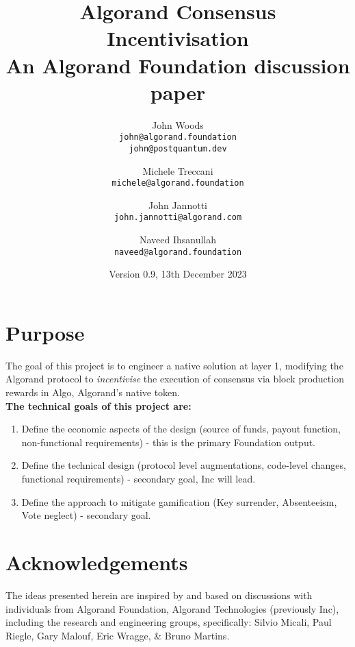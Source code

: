 \documentclass[11pt,a4paper]{article}
\begin{document}
\title {Algorand Consensus Incentivisation \\
       {\large \sc An Algorand Foundation discussion paper}}
\date  {Version 0.9, 13th December 2023}
\author{
    John Woods \\ 
    {\small \texttt{john@algorand.foundation}} \\
    {\small \texttt{john@postquantum.dev}} \\
\and 
    Michele Treccani \\
    {\small \texttt{michele@algorand.foundation}}
\and 
    John Jannotti \\
    {\small \texttt{john.jannotti@algorand.com}}
\and 
    Naveed Ihsanullah \\
    {\small \texttt{naveed@algorand.foundation}}
}

\maketitle

\section{Purpose}
The goal of this project is to engineer a native solution at layer 1, modifying the Algorand protocol to 
\emph{incentivise} the execution of consensus via block production rewards in Algo, Algorand's native token. \\

\textbf{The technical goals of this project are:}

\begin{enumerate}
    \item Define the economic aspects of the design (source of funds, payout function, non-functional requirements) - 
        this is the primary Foundation output.
    \item Define the technical design (protocol level augmentations, code-level changes, functional requirements) 
        - secondary goal, Inc will lead.
    \item Define the approach to mitigate gamification (Key surrender, Absenteeism, Vote neglect) - secondary goal.
\end{enumerate}

\pagebreak

\tableofcontents

\pagebreak

\section{Acknowledgements}
The ideas presented herein are inspired by and based on discussions with individuals from Algorand Foundation, 
Algorand Technologies (previously Inc), including the research and engineering groups, specifically: Silvio Micali, 
Paul Riegle, Gary Malouf, Eric Wragge, \& Bruno Martins.
\end{document}
